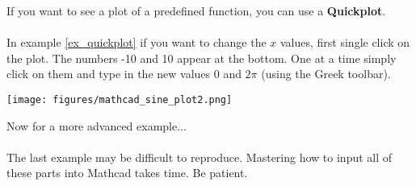 If you want to see a plot of a predefined function, you can use a \textbf{Quickplot}.\\

\\

In example \ref{ex_quickplot} if you want to change the $x$ values, first single click on the plot.  The numbers -10 and 10 appear at the bottom.  One at a time simply click on them and type in the new values 0 and $2 \pi$ (using the Greek toolbar).

\texttt{[image: figures/mathcad\_sine\_plot2.png]}

Now for a more advanced example...\\

\\

The last example may be difficult to reproduce.  Mastering how to input all of these parts into Mathcad takes time.  Be patient.

\newpage
{}